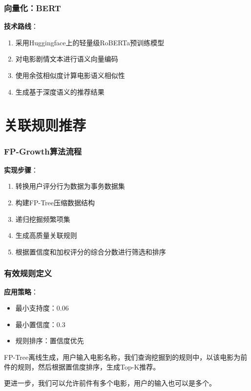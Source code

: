 \documentclass{beamer}
\begin{document}
\begin{frame}
    \frametitle{向量化：BERT}
    \textbf{技术路线}：
    \begin{enumerate}
        \item 采用Huggingface上的轻量级RoBERTa预训练模型
        \item 对电影剧情文本进行语义向量编码
        \item 使用余弦相似度计算电影语义相似性
        \item 生成基于深度语义的推荐结果
    \end{enumerate}
\end{frame}

\section{关联规则推荐}

\begin{frame}
    \frametitle{FP-Growth算法流程}
    \textbf{实现步骤}：
    \begin{enumerate}
        \item 转换用户评分行为数据为事务数据集
        \item 构建FP-Tree压缩数据结构
        \item 递归挖掘频繁项集
        \item 生成高质量关联规则
        \item 根据置信度和加权评分的综合分数进行筛选和排序
    \end{enumerate}
\end{frame}

\begin{frame}
    \frametitle{有效规则定义}

    \vspace{0.5cm}
    \textbf{应用策略}：
    \begin{itemize}
        \item 最小支持度：0.06
        \item 最小置信度：0.3
        \item 规则排序：置信度优先
    \end{itemize}

    FP-Tree离线生成，用户输入电影名称，我们查询挖掘到的规则中，以该电影为前件的规则，然后根据置信度排序，生成Top-K推荐。

    更进一步，我们可以允许前件有多个电影，用户的输入也可以是多个。
\end{frame}




\end{document}
